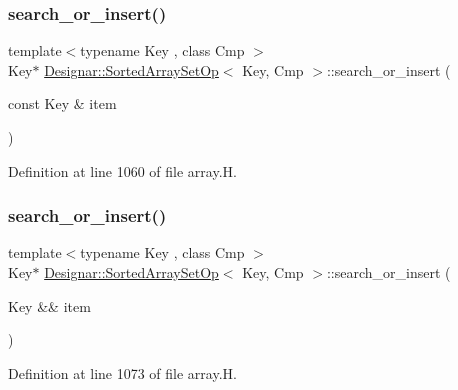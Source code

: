 \subsubsection{\texorpdfstring{search\+\_\+or\+\_\+insert()}{search\_or\_insert()}\hspace{0.1cm}{\footnotesize\ttfamily [1/2]}}
{\footnotesize\ttfamily template$<$typename Key , class Cmp $>$ \\
Key$\ast$ \hyperlink{class_designar_1_1_sorted_array_set_op}{Designar\+::\+Sorted\+Array\+Set\+Op}$<$ Key, Cmp $>$\+::search\+\_\+or\+\_\+insert (\begin{DoxyParamCaption}\item[{const Key \&}]{item }\end{DoxyParamCaption})\hspace{0.3cm}{\ttfamily [inline]}}



Definition at line 1060 of file array.\+H.

\mbox{\label{class_designar_1_1_sorted_array_set_op_ad0299c41514cf11f5a418b9e46994580}} 
\subsubsection{\texorpdfstring{search\+\_\+or\+\_\+insert()}{search\_or\_insert()}\hspace{0.1cm}{\footnotesize\ttfamily [2/2]}}
{\footnotesize\ttfamily template$<$typename Key , class Cmp $>$ \\
Key$\ast$ \hyperlink{class_designar_1_1_sorted_array_set_op}{Designar\+::\+Sorted\+Array\+Set\+Op}$<$ Key, Cmp $>$\+::search\+\_\+or\+\_\+insert (\begin{DoxyParamCaption}\item[{Key \&\&}]{item }\end{DoxyParamCaption})\hspace{0.3cm}{\ttfamily [inline]}}



Definition at line 1073 of file array.\+H.

\mbox{\label{class_designar_1_1_sorted_array_set_op_ad08d29cf21ed0afa0e59ab86fb171108}} 
